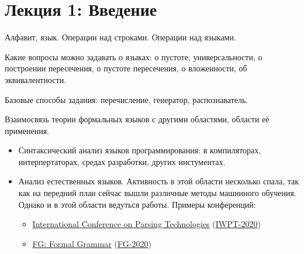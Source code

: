 \section{Лекция 1: Введение}

Алфавит, язык. Операции над строками. Операции над языками.

Какие вопросы можно задавать о языках: о пустоте, универсальности, о построении пересечения, о пустоте пересечения, о вложенности, об эквивалентности.

Базовые способы задания: перечисление, генератор, распознаватель.

Взаимосвязь теории формальных языков с другими областями, области её применения.
\begin{itemize}
  \item Синтаксический анализ языков программирования: в компиляторах, интерпертаторах, средах разработки, других инстументах.
  \item Анализ естественных языков.
  Активность в этой области несколько спала, так как на передний план сейчас вышли различные методы машинного обучения.
  Однако и в этой области ведуться работы. 
  Примеры конференций: 
  \begin{itemize}
    \item \href{http://www.wikicfp.com/cfp/servlet/event.showcfp?eventid=98626&copyownerid=320}{International Conference on Parsing Technologies} (\href{https://iwpt20.sigparse.org/callforpapers.html}{IWPT-2020})
    \item \href{http://www.wikicfp.com/cfp/program?id=1029&s=FG&f=Formal%20Grammar}{FG: Formal Grammar} (\href{http://fg.phil.hhu.de/2020/}{FG-2020})
  \end{itemize}


\end{itemize}
